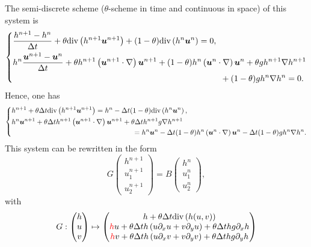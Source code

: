 \documentclass[a4paper, 11pt]{article}
\begin{document}
The semi-discrete scheme ($\theta$-scheme in time and continuous in space) of this system is
\begin{equation*}
\left\{\begin{split}
&\frac{h^{n+1}-h^n}{\Delta t}+\theta\text{div}\left(h^{n+1}\boldsymbol{u}^{n+1}\right)+(1-\theta)\text{div}\left(h^{n}\boldsymbol{u}^{n}\right)=0,\\
&h^n\frac{\boldsymbol{u}^{n+1}-\boldsymbol{u}^{n}}{\Delta t}+\theta h^{n+1}\left(\boldsymbol{u}^{n+1}\cdot \nabla\right)\boldsymbol{u}^{n+1}+(1-\theta) h^{n}\left(\boldsymbol{u}^{n}\cdot \nabla\right)\boldsymbol{u}^{n}+\theta gh^{n+1}\nabla h^{n+1}\\
&\hspace*{8.7cm}+(1-\theta)gh^n\nabla h^n=0.
\end{split}\right.
\end{equation*}
Hence, one has
\begin{equation*}
\left\{
\begin{split}
&h^{n+1}+\theta\Delta t\text{div}\left(h^{n+1}\boldsymbol{u}^{n+1}\right)=h^n-\Delta t(1-\theta)\text{div}\left(h^n\boldsymbol{u}^n\right),\\
&h^n\boldsymbol{u}^{n+1}+\theta\Delta th^{n+1}\left(\boldsymbol{u}^{n+1}\cdot\nabla\right)\boldsymbol{u}^{n+1}+\theta\Delta th^{n+1}g\nabla h^{n+1}\\
&\hspace*{6cm}=h^n\boldsymbol{u}^n-\Delta t(1-\theta)h^n\left(\boldsymbol{u}^n\cdot \nabla\right)\boldsymbol{u}^n-\Delta t(1-\theta)gh^n\nabla h^n.
\end{split}
\right.
\end{equation*}
This system can be rewritten in the form
\begin{equation*}
G\begin{pmatrix}h^{n+1}\\u_1^{n+1}\\u_2^{n+1}\end{pmatrix}=B\begin{pmatrix}h^n\\u_1^n\\u_2^n\end{pmatrix},
\end{equation*}
with 
\begin{equation*}
G:\begin{pmatrix}h\\u\\v\end{pmatrix}\mapsto\begin{pmatrix}h+\theta\Delta t\text{div}\left(h(u,v)\right)\\
\textcolor{red}{h}u+\theta\Delta t h\left(u\partial_xu+v\partial_yu\right)+\theta \Delta thg\partial_x h\\
\textcolor{red}{h}v+\theta\Delta t h\left(u\partial_xv+v\partial_yv\right)+\theta \Delta thg\partial_y h
\end{pmatrix}
\end{equation*}
\end{document}
